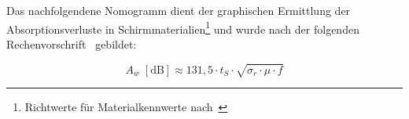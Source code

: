 

Das nachfolgendene Nomogramm dient der graphischen Ermittlung der Absorptionsverluste in Schirmmaterialien\footnote{Richtwerte für Materialkennwerte nach~\cite{Simplified_shielding}} und wurde nach der folgenden Rechenvorschrift~\cite{Simplified_shielding} gebildet:

\begin{equation}
    A_w \; \left[\text{dB}\right] \approx 131,5 \cdot t_S \cdot \sqrt{\sigma_r \cdot \mu \cdot f}
\end{equation}